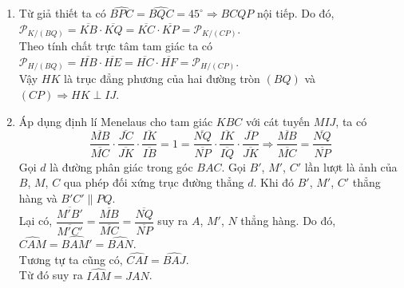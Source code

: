 \begin{bt}
{\begin{center}
		\end{center}
		\begin{enumerate}
			\item Từ giả thiết ta có $\widehat{BPC}=\widehat{BQC}=45^\circ \Rightarrow BCQP$ nội tiếp. 
			Do đó, $\mathscr{P}_{K/(BQ)}=\overline{KB} \cdot \overline{KQ}=\overline{KC} \cdot \overline{KP}=\mathscr{P}_{K/(CP)}$.\\
			Theo tính chất trực tâm tam giác ta có $\mathscr{P}_{H/(BQ)}=\overline{HB} \cdot \overline{HE}=\overline{HC} \cdot \overline{HF}=\mathscr{P}_{H/(CP)}$.\\
			Vậy $HK$ là trục đẳng phương của hai đường tròn $(BQ)$  và $(CP) \Rightarrow HK \perp IJ$.   
			
			\item Áp dụng định lí Menelaus cho tam giác $KBC$ với cát tuyến $MIJ$, ta có
			$$\dfrac{\overline{MB}}{\overline{MC}} \cdot\dfrac{\overline{JC}}{\overline{JK}} \cdot \dfrac{\overline{IK}}{\overline{IB}}=1 =\dfrac{\overline{NQ}}{\overline{NP}} \cdot \dfrac{\overline{IK}}{\overline{IQ}} \cdot \dfrac{\overline{JP}}{\overline{JK}} \Rightarrow \dfrac{\overline{MB}}{\overline{MC}}=\dfrac{\overline{NQ}}{\overline{NP}}$$
			Gọi $d$ là đường phân giác trong góc $BAC$. Gọi  $B'$, $M'$, $C'$ lần lượt là ảnh của $B$, $M$, $C$ qua phép đối xứng trục đường thẳng $d$. Khi đó $B'$, $M'$, $C'$  thẳng hàng và $B'C' \parallel PQ$.\\
			Lại có, $\dfrac{\overline{M'B'}}{\overline{M'C'}}=\dfrac{\overline{MB}}{\overline{MC}}=\dfrac{\overline{NQ}}{\overline{NP}}$  suy ra  $A$, $M'$, $N$ thẳng hàng. Do đó, $\widehat{CAM}=\widehat{BAM'}=\widehat{BAN}$.\\
			Tương tự ta cũng có, $\widehat{CAI}=\widehat{BAJ}$.\\
			Từ đó suy ra $\widehat{IAM}=\widehat{JAN}$.
		\end{enumerate}
	}
\end{bt}

